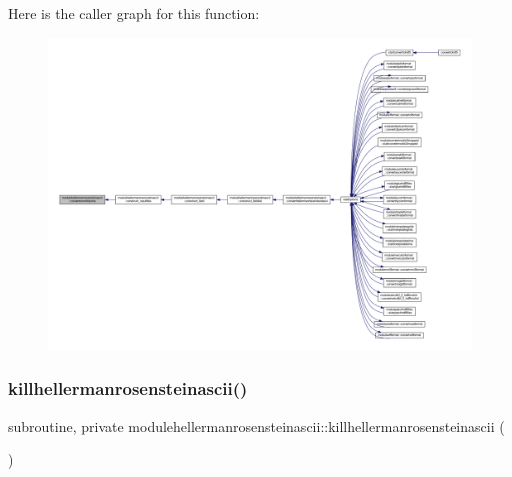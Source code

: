 Here is the caller graph for this function\+:\nopagebreak
\begin{figure}[H]
\begin{center}
\leavevmode
\includegraphics[width=350pt]{namespacemodulehellermanrosensteinascii_a8d26b87c5c59b45954adf68b0ada3545_icgraph}
\end{center}
\end{figure}
\mbox{\label{namespacemodulehellermanrosensteinascii_a2350c23791f119cd18bfa9a4e532508c}} 
\subsubsection{\texorpdfstring{killhellermanrosensteinascii()}{killhellermanrosensteinascii()}}
{\footnotesize\ttfamily subroutine, private modulehellermanrosensteinascii\+::killhellermanrosensteinascii (\begin{DoxyParamCaption}{ }\end{DoxyParamCaption})\hspace{0.3cm}{\ttfamily [private]}}

